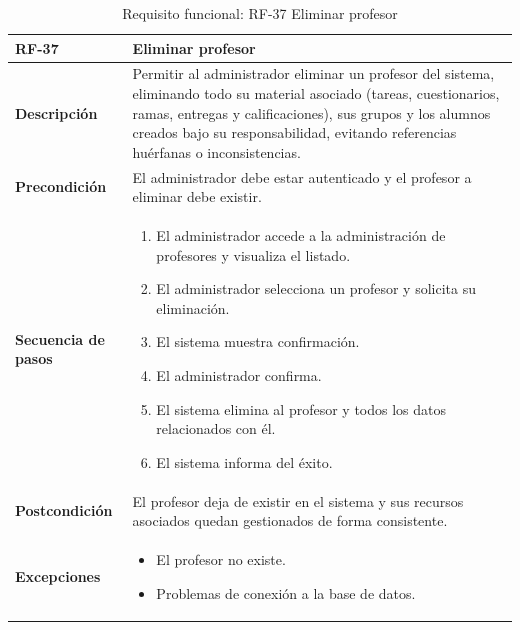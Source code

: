 \begin{table}[H]
\centering
\begin{tabularx}{\textwidth}{
  |>{\centering\arraybackslash}l
  |>{\centering\arraybackslash}X|}
\hline
\textbf{RF-37} & \textbf{Eliminar profesor} \\ \hline
\textbf{Descripción} & Permitir al administrador eliminar un profesor del sistema, eliminando todo su material asociado (tareas, cuestionarios, ramas, entregas y
calificaciones), sus grupos y los alumnos creados bajo su responsabilidad, evitando referencias huérfanas o inconsistencias. \\ \hline
\textbf{Precondición} & El administrador debe estar autenticado y el profesor a eliminar debe existir. \\ \hline
\textbf{Secuencia de pasos} &
\begin{enumerate}
  \item El administrador accede a la administración de profesores y visualiza el listado.
  \item El administrador selecciona un profesor y solicita su eliminación.
  \item El sistema muestra confirmación.
  \item El administrador confirma.
  \item El sistema elimina al profesor y todos los datos relacionados con él.
  \item El sistema informa del éxito.
\end{enumerate} \\ \hline
\textbf{Postcondición} & El profesor deja de existir en el sistema y sus recursos asociados quedan gestionados de forma consistente. \\ \hline
\textbf{Excepciones} &
\begin{itemize}
  \item El profesor no existe.
  \item Problemas de conexión a la base de datos.
\end{itemize} \\ \hline
\end{tabularx}
\caption{Requisito funcional: RF-37 Eliminar profesor}
\end{table}

